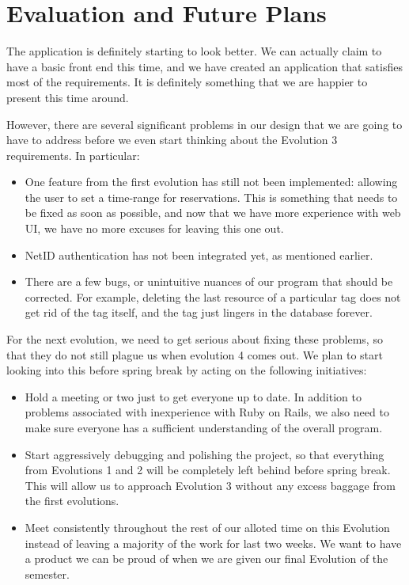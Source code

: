 \documentclass{article}
\begin{document}
\section{Evaluation and Future Plans}
The application is definitely starting to look better.  We can actually claim to have a basic front end this time, and we have created an application that satisfies most of the requirements.  It is definitely something that we are happier to present this time around.\par
However, there are several significant problems in our design that we are going to have to address before we even start thinking about the Evolution 3 requirements.  In particular:
\begin{itemize}
\item{One feature from the first evolution has still not been implemented: allowing the user to set a time-range for reservations.  This is something that needs to be fixed as soon as possible, and now that we have more experience with web UI, we have no more excuses for leaving this one out.}
\item{NetID authentication has not been integrated yet, as mentioned earlier.}
\item{There are a few bugs, or unintuitive nuances of our program that should be corrected.  For example, deleting the last resource of a particular tag does not get rid of the tag itself, and the tag just lingers in the database forever.}
\end{itemize}
For the next evolution, we need to get serious about fixing these problems, so that they do not still plague us when evolution 4 comes out.  We plan to start looking into this before spring break by acting on the following initiatives:
\begin{itemize}
\item{Hold a meeting or two just to get everyone up to date.  In addition to problems associated with inexperience with Ruby on Rails, we also need to make sure everyone has a sufficient understanding of the overall program.}
\item{Start aggressively debugging and polishing the project, so that everything from Evolutions 1 and 2 will be completely left behind before spring break.  This will allow us to approach Evolution 3 without any excess baggage from the first evolutions.}
\item{Meet consistently throughout the rest of our alloted time on this Evolution instead of leaving a majority of the work for last two weeks. We want to have a product we can be proud of when we are given our final Evolution of the semester.}
\end{itemize}
\end{document}
